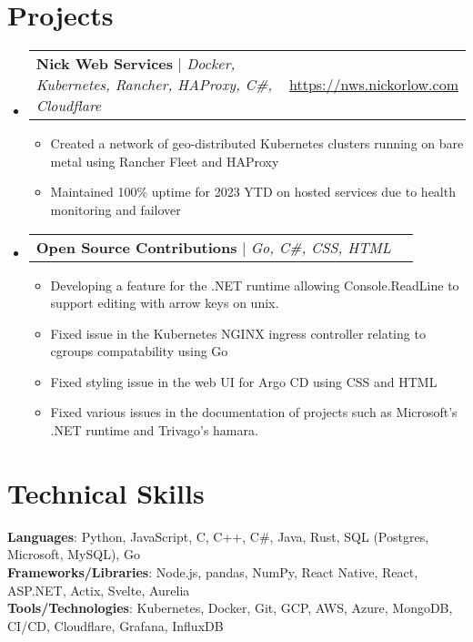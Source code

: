 \documentclass[letterpaper,11pt]{article}
\makeatletter
\newcommand{\resumeItem}[1]{
  \item\small{
    {#1 \vspace{-2pt}}
  }
}
\newcommand{\resumeProjectHeading}[2]{
    \item
    \begin{tabular*}{0.97\textwidth}{l@{\extracolsep{\fill}}r}
      \small#1 & \underline{\href{#2}{#2}} \\
    \end{tabular*}\vspace{-7pt}
}
\newcommand{\resumeSubHeadingListStart}{\begin{itemize}[leftmargin=0.15in, label={}]}
\newcommand{\resumeSubHeadingListEnd}{\end{itemize}}
\newcommand{\resumeItemListStart}{\begin{itemize}}
\newcommand{\resumeItemListEnd}{\end{itemize}\vspace{-3pt}}
\makeatother
\begin{document}
\section{Projects}
    \resumeSubHeadingListStart
      \resumeProjectHeading
          {\textbf{Nick Web Services} $|$ \emph{Docker, Kubernetes, Rancher, HAProxy, C\#, Cloudflare}}{https://nws.nickorlow.com}
          \resumeItemListStart
            \resumeItem{Created a network of geo-distributed Kubernetes clusters running on bare metal using Rancher Fleet and HAProxy}
            \resumeItem{Maintained 100\% uptime for 2023 YTD on hosted services due to health monitoring and failover}
          \resumeItemListEnd
          \resumeProjectHeading
          {\textbf{Open Source Contributions} $|$ \emph{Go, C\#, CSS, HTML}}{}
          \resumeItemListStart
            \resumeItem{Developing a feature for the .NET runtime allowing Console.ReadLine to support editing with arrow keys on unix.}
            \resumeItem{Fixed issue in the Kubernetes NGINX ingress controller relating to cgroups compatability using Go}
            \resumeItem{Fixed styling issue in the web UI for Argo CD using CSS and HTML}
            \resumeItem{Fixed various issues in the documentation of projects such as Microsoft's .NET runtime and Trivago's hamara.}
          \resumeItemListEnd
    \resumeSubHeadingListEnd

\section{Technical Skills}
 \begin{itemize}[leftmargin=0.15in, label={}]
    \small{\item{
     \textbf{Languages}{:  Python, JavaScript, C, C++, C\#, Java, Rust, SQL (Postgres, Microsoft, MySQL), Go} \\
     \textbf{Frameworks/Libraries}{: Node.js, pandas, NumPy, React Native, React, ASP.NET, Actix, Svelte, Aurelia} \\
     \textbf{Tools/Technologies}{: Kubernetes, Docker, Git, GCP, AWS, Azure, MongoDB, CI/CD, Cloudflare, Grafana, InfluxDB} \\
    }}
 \end{itemize}


\end{document}
